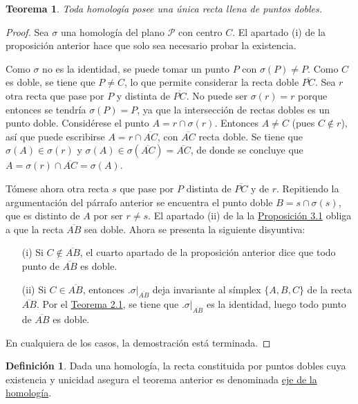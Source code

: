 \documentclass[12pt]{report}
\newtheorem{theorem}{Teorema}[chapter]
\theoremstyle{definition}
\newtheorem{definition}{Definición}[chapter]
\theoremstyle{definition}
\theoremstyle{remark}
\begin{document}
\begin{theorem}
Toda homología posee una única recta llena de puntos dobles.
\end{theorem}

\begin{proof}
Sea $\sigma$ una homología del plano $\mathcal{P}$ con centro $C$. El apartado (i) de la proposición anterior hace que solo sea necesario probar la existencia. 

\vspace{2mm}
Como $\sigma$ no es la identidad, se puede tomar un punto $P$ con $\sigma(P) \neq P$. Como $C$ es doble, se tiene que $P \neq C$, lo que permite considerar la recta doble $\overline{PC}$. Sea $r$ otra recta que pase por $P$ y distinta de $\overline{PC}$. No puede ser $\sigma(r) = r$ porque entonces se tendría $\sigma(P) = P$, ya que la intersección de rectas dobles es un punto doble. Considérese el punto $A = r \cap \sigma(r)$. Entonces $A \neq C$ (pues $C \notin r$), así que puede escribirse $A = r \cap \overline{AC}$, con $\overline{AC}$ recta doble. Se tiene que $\sigma(A) \in \sigma(r)$ y $\sigma(A) \in \sigma(\overline{AC}) = \overline{AC}$, de donde se concluye que $A = \sigma(r) \cap \overline{AC} = \sigma(A)$.

\vspace{2mm}
Tómese ahora otra recta $s$ que pase por $P$ distinta de $\overline{PC}$ y de $r$. Repitiendo la argumentación del párrafo anterior se encuentra el punto doble $B = s \cap \sigma(s)$, que es distinto de $A$ por ser $r \neq s$. El apartado (ii) de la la \hyperref[prop3.1.]{\color{blue}Proposición 3.1} obliga a que la recta $\overline{AB}$ sea doble. Ahora se presenta la siguiente disyuntiva:
\begin{itemize}
    \item[(i)] Si $C \notin \overline{AB}$, el cuarto apartado de la proposición anterior dice que todo punto de $\overline{AB}$ es doble.
    \item[(ii)] Si $C \in \overline{AB}$, entonces $\bigl.\sigma\bigr|_{\overline{AB}}$ deja invariante al símplex $\{A, B, C\}$ de la recta $\overline{AB}$. Por el \hyperref[teo2.1.]{\color{blue}Teorema 2.1}, se tiene que $\bigl.\sigma\bigr|_{\overline{AB}}$ es la identidad, luego todo punto de $\overline{AB}$ es doble.
\end{itemize}
En cualquiera de los casos, la demostración está terminada.
\end{proof}

\begin{definition}
Dada una homología, la recta constituida por puntos dobles cuya existencia y unicidad asegura el teorema anterior es denominada \ul{eje de la homología}.
\end{definition}
\end{document}
